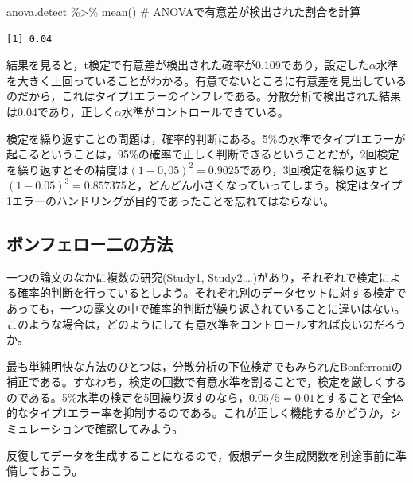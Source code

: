 \documentclass[
  a4paper,
]{ltjsbook}
\newenvironment{Shaded}{\begin{snugshade}}{\end{snugshade}}
\newcommand{\CommentTok}[1]{\textcolor[rgb]{0.37,0.37,0.37}{#1}}
\newcommand{\FunctionTok}[1]{\textcolor[rgb]{0.28,0.35,0.67}{#1}}
\newcommand{\NormalTok}[1]{\textcolor[rgb]{0.00,0.23,0.31}{#1}}
\newcommand{\SpecialCharTok}[1]{\textcolor[rgb]{0.37,0.37,0.37}{#1}}
\begin{document}
\begin{Shaded}
\begin{Highlighting}[]
\NormalTok{anova.detect }\SpecialCharTok{\%\textgreater{}\%} \FunctionTok{mean}\NormalTok{() }\CommentTok{\# ANOVAで有意差が検出された割合を計算}
\end{Highlighting}
\end{Shaded}

\begin{verbatim}
[1] 0.04
\end{verbatim}

結果を見ると，t検定で有意差が検出された確率が0.109であり，設定した\(\alpha\)水準を大きく上回っていることがわかる。有意でないところに有意差を見出しているのだから，これはタイプ1エラーのインフレである。分散分析で検出された結果は0.04であり，正しく\(\alpha\)水準がコントロールできている。

検定を繰り返すことの問題は，確率的判断にある。5\%の水準でタイプ1エラーが起こるということは，95\%の確率で正しく判断できるということだが，2回検定を繰り返すとその精度は\((1-0,05)^2=0.9025\)であり，3回検定を繰り返すと\((1-0.05)^3=0.857375\)と，どんどん小さくなっていってしまう。検定はタイプ1エラーのハンドリングが目的であったことを忘れてはならない。

\subsection{ボンフェロー二の方法}\label{ux30dcux30f3ux30d5ux30a7ux30edux30fcux4e8cux306eux65b9ux6cd5}

一つの論文のなかに複数の研究(Study1,
Study2,\ldots)があり，それぞれで検定による確率的判断を行っているとしよう。それぞれ別のデータセットに対する検定であっても，一つの露文の中で確率的判断が繰り返されていることに違いはない。このような場合は，どのようにして有意水準をコントロールすれば良いのだろうか。

最も単純明快な方法のひとつは，分散分析の下位検定でもみられたBonferroniの補正である。すなわち，検定の回数で有意水準を割ることで，検定を厳しくするのである。5\%水準の検定を5回繰り返すのなら，\(0.05/5=0.01\)とすることで全体的なタイプ1エラー率を抑制するのである。これが正しく機能するかどうか，シミュレーションで確認してみよう。

反復してデータを生成することになるので，仮想データ生成関数を別途事前に準備しておこう。
\end{document}
